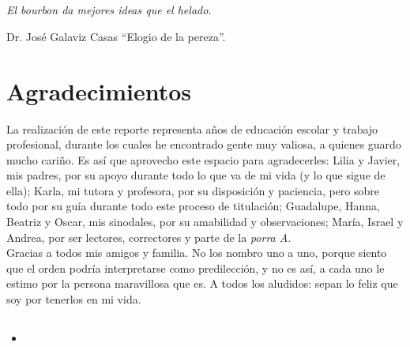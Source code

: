 \chapter*{}\label{epigrafe}
\thispagestyle{empty}
\vspace*{150px}
\begin{flushright}
	\begin{Large}
		\textit{El bourbon da mejores ideas que el helado.}\\
	\end{Large}
Dr. José Galaviz Casas ``Elogio de la pereza''.
\end{flushright}
\clearpage
\thispagestyle{empty}

\chapter*{Agradecimientos}\label{agradecimientos}
\thispagestyle{empty}
\noindent La realización de este reporte representa años de educación escolar y trabajo profesional, durante los cuales he encontrado gente muy valiosa, a quienes guardo mucho cariño. Es así que aprovecho este espacio para agradecerles: Lilia y Javier, mis padres, por su apoyo durante todo lo que va de mi vida (y lo que sigue de ella); Karla, mi tutora y profesora, por su disposición y paciencia, pero sobre todo por su guía durante todo este proceso de titulación; Guadalupe, Hanna, Beatriz y Oscar, mis sinodales, por su amabilidad y observaciones; María, Israel y Andrea, por ser lectores, correctores y parte de la \textit{porra A}.\\
\indent Gracias a todos mis amigos y familia. No los nombro uno a uno, porque siento que el orden podría interpretarse como predilección, y no es así, a cada uno le estimo por la persona maravillosa que es. A todos los aludidos: sepan lo feliz que soy por tenerlos en mi vida.
\pagebreak
\section*{}
\begin{itemize}
	\item[]	
\end{itemize}
\thispagestyle{empty}
